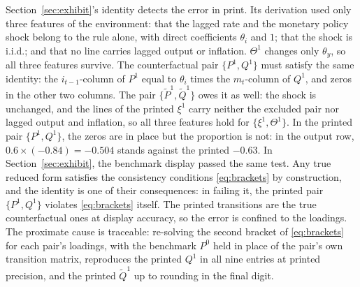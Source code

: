 \documentclass[11pt]{article}
\theoremstyle{remark}
\begin{document}
Section~\ref{sec:exhibit}'s identity detects the error in print. Its derivation used only three features of the environment: that the lagged rate and the monetary policy shock belong to the rule alone, with direct coefficients $\theta_i$ and $1$; that the shock is i.i.d.; and that no line carries lagged output or inflation. $\Theta^1$ changes only $\theta_y$, so all three features survive. The counterfactual pair $\{P^1,Q^1\}$ must satisfy the same identity: the $i_{t-1}$-column of $P^1$ equal to $\theta_i$ times the $m_t$-column of $Q^1$, and zeros in the other two columns. The pair $\{\tilde P^1,\tilde Q^1\}$ owes it as well: the shock is unchanged, and the lines of the printed $\xi^1$ carry neither the excluded pair nor lagged output and inflation, so all three features hold for $\{\xi^1,\Theta^1\}$. In the printed pair $\{P^1,Q^1\}$, the zeros are in place but the proportion is not: in the output row, $0.6\times(-0.84)=-0.504$ stands against the printed $-0.63$. In Section~\ref{sec:exhibit}, the benchmark display passed the same test. Any true reduced form satisfies the consistency conditions \eqref{eq:brackets} by construction, and the identity is one of their consequences: in failing it, the printed pair $\{P^1,Q^1\}$ violates \eqref{eq:brackets} itself. The printed transitions are the true counterfactual ones at display accuracy, so the error is confined to the loadings. The proximate cause is traceable: re-solving the second bracket of \eqref{eq:brackets} for each pair's loadings, with the benchmark $P^0$ held in place of the pair's own transition matrix, reproduces the printed $Q^1$ in all nine entries at printed precision, and the printed $\tilde Q^1$ up to rounding in the final digit.
\end{document}
